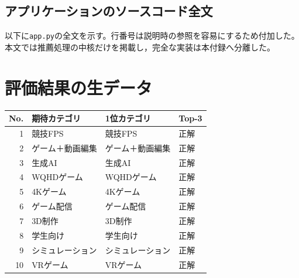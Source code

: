 \documentclass[a4paper,11pt]{article}
\begin{document}
\subsection{アプリケーションのソースコード全文}
以下に\verb|app.py|の全文を示す。行番号は説明時の参照を容易にするため付加した。
本文では推薦処理の中核だけを掲載し，完全な実装は本付録へ分離した。


\section{評価結果の生データ}
\begin{center}
\begin{tabular}{rlll}
  \toprule
  No. & 期待カテゴリ & 1位カテゴリ & Top-3\\
  \midrule
  1 & 競技FPS & 競技FPS & 正解\\
  2 & ゲーム＋動画編集 & ゲーム＋動画編集 & 正解\\
  3 & 生成AI & 生成AI & 正解\\
  4 & WQHDゲーム & WQHDゲーム & 正解\\
  5 & 4Kゲーム & 4Kゲーム & 正解\\
  6 & ゲーム配信 & ゲーム配信 & 正解\\
  7 & 3D制作 & 3D制作 & 正解\\
  8 & 学生向け & 学生向け & 正解\\
  9 & シミュレーション & シミュレーション & 正解\\
  10 & VRゲーム & VRゲーム & 正解\\
  \bottomrule
\end{tabular}
\end{center}
\end{document}
